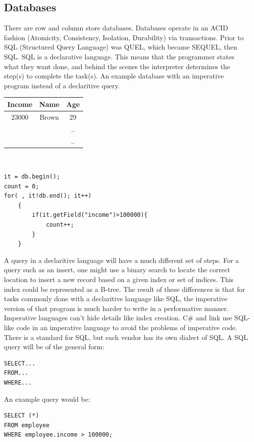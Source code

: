 \documentclass[twoside]{article}
\begin{document}
\subsection{Databases}
There are row and column store databases. Databases operate in an ACID fashion (Atomicity, Consistency, Isolation, Durability) via transactions. Prior to SQL (Structured Query Language) was QUEL, which became SEQUEL, then SQL. SQL is a declarative language. This means that the programmer states what they want done, and behind the scenes the interpreter determines the step(s) to complete the task(s).
An example database with an imperative program instead of a declaritive query.\\
\begin{tabular}{c|c|c}
Income & Name & Age\\
\hline
23000 & Brown & 29 \\
 & & .. \\
 & & .. \\
 \hline
\end{tabular}
\\
\begin{lstlisting}
it = db.begin();
count = 0;
for( , it!db.end(); it++)
    {
        if(it.getField("income")>100000){
            count++;
        }
    }
\end{lstlisting}

A query in a declaritive language will have a much different set of steps. For a query such as an insert, one might use a binary search to locate the correct location to insert a new record based on a given index or set of indices. This index could be represented as a B-tree. The result of these differences is that for tasks commonly done with a declaritive language like SQL, the imperative version of that program is much harder to write in a performative manner. Imperative languages can't hide details like index creation. C\# and link use SQL-like code in an imperative language to avoid the problems of imperative code.\\
There is a standard for SQL, but each vendor has its own dialect of SQL. A SQL query will be of the general form:\\
\begin{lstlisting}
SELECT...
FROM...
WHERE...
\end{lstlisting}
An example query would be:
\begin{lstlisting}
SELECT (*)
FROM employee 
WHERE employee.income > 100000;
\end{lstlisting}
\end{document}
